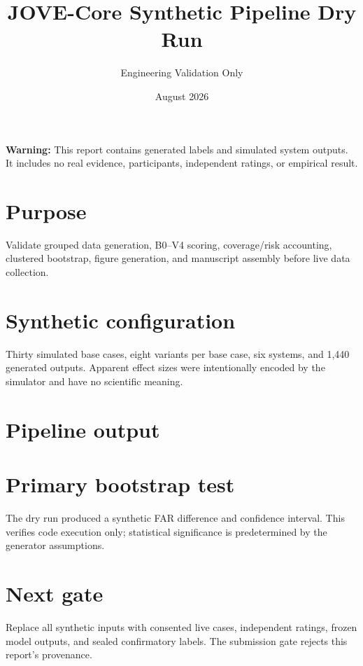 \documentclass[11pt]{article}
\title{JOVE-Core Synthetic Pipeline Dry Run}
\author{Engineering Validation Only}
\date{August 2026}
\begin{document}
\maketitle
\noindent\colorbox{red!15}{\parbox{0.96\linewidth}{\textbf{Warning:} This report contains generated labels and simulated system outputs. It includes no real evidence, participants, independent ratings, or empirical result.}}
\section{Purpose}
Validate grouped data generation, B0--V4 scoring, coverage/risk accounting, clustered bootstrap, figure generation, and manuscript assembly before live data collection.
\section{Synthetic configuration}
Thirty simulated base cases, eight variants per base case, six systems, and 1,440 generated outputs. Apparent effect sizes were intentionally encoded by the simulator and have no scientific meaning.
\section{Pipeline output}

\section{Primary bootstrap test}
The dry run produced a synthetic FAR difference and confidence interval. This verifies code execution only; statistical significance is predetermined by the generator assumptions.
\section{Next gate}
Replace all synthetic inputs with consented live cases, independent ratings, frozen model outputs, and sealed confirmatory labels. The submission gate rejects this report's provenance.
\end{document}
